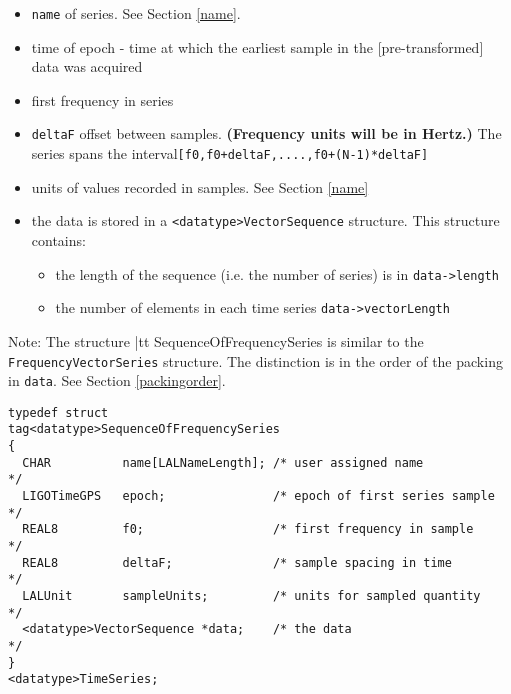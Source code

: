 \documentclass[]{ligodcc}
\begin{document}
\begin{itemize}
\vspace{-0.15in}
\item
{\tt name} of series. See Section \ref{name}.
\vspace{-0.15in}
\item
time of {epoch} - time at which the earliest sample in the
[pre-transformed] data was acquired
\vspace{-0.15in}
\item
first frequency in series
\vspace{-0.15in}
\item
{\tt deltaF} offset between samples.  {\bf (Frequency units will be in Hertz.)}
The series spans the interval{\tt [f0,f0+deltaF,....,f0+(N-1)*deltaF]}
\vspace{-0.15in}
\item
units of values recorded in samples. See Section \ref{name}
\vspace{-0.15in}
\item
the data is stored in a {\tt <datatype>VectorSequence}  structure. This structure contains:
\begin{itemize}
\vspace{-0.10in}
\item
the length of the sequence (i.e. the number of series) is  in {\tt data->length}
\vspace{-0.10in}
\item
 the number of elements in each time series {\tt data->vectorLength}
\end{itemize}
\end{itemize}


Note: The structure {|tt SequenceOfFrequencySeries} is similar to the
{\tt FrequencyVectorSeries} structure. The distinction is in the order of
the packing in {\tt *data}. See Section \ref{packingorder}.

{\footnotesize
\begin{verbatim}
typedef struct
tag<datatype>SequenceOfFrequencySeries
{
  CHAR          name[LALNameLength]; /* user assigned name           */
  LIGOTimeGPS   epoch;               /* epoch of first series sample */
  REAL8         f0;                  /* first frequency in sample    */
  REAL8         deltaF;              /* sample spacing in time       */
  LALUnit       sampleUnits;         /* units for sampled quantity   */
  <datatype>VectorSequence *data;    /* the data                     */
}
<datatype>TimeSeries;
\end{verbatim}}
\end{document}
